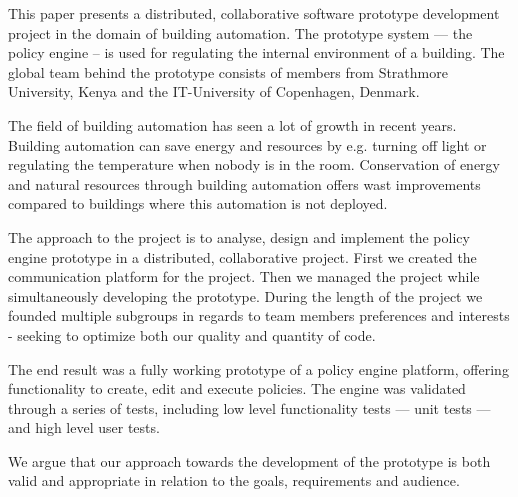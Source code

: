 This paper presents a distributed, collaborative software prototype development project in the domain of building automation. The prototype system --- the policy engine -- is used for regulating the internal environment of a building. The global team behind the prototype consists of members from Strathmore University, Kenya and the IT-University of Copenhagen, Denmark. 

The field of building automation has seen a lot of growth in recent years. Building automation can save energy and resources by e.g. turning off light or regulating the temperature when nobody is in the room. Conservation of energy and natural resources through building automation offers wast improvements compared to buildings where this automation is not deployed. 

The approach to the project is to analyse, design and implement the policy engine prototype in a distributed, collaborative project. First we created the communication platform for the project. Then we managed the project while simultaneously developing the prototype. During the length of the project we founded multiple subgroups in regards to team members preferences and interests - seeking to optimize both our quality and quantity of code.

The end result was a fully working prototype of a policy engine platform, offering functionality to create, edit and execute policies. The engine was validated through a series of tests, including low level functionality tests --- unit tests --- and high level user tests. 

We argue that our approach towards the development of the prototype is both valid and appropriate in relation to the goals, requirements and audience.